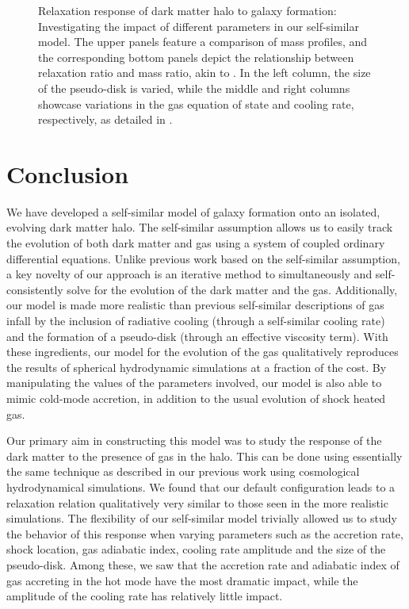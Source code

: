 \begin{figure}[htbp]
\caption{Relaxation response of dark matter halo to galaxy formation: Investigating the impact of different parameters in our self-similar model. The upper panels feature a comparison of mass profiles, and the corresponding bottom panels depict the relationship between relaxation ratio and mass ratio, akin to . In the left column, the size of the pseudo-disk is varied, while the middle and right columns showcase variations in the gas equation of state and cooling rate, respectively, as detailed in .}
\label{fig:relx_reln_all2}
\end{figure}


\section{Conclusion}
\label{sec:conclusion}
We have developed a self-similar model of galaxy formation onto an isolated, evolving dark matter halo. The self-similar assumption allows us to easily track the evolution of both dark matter and gas using a system of coupled ordinary differential equations. Unlike previous work based on the self-similar assumption, a key novelty of our approach is an iterative method to simultaneously and self-consistently solve for the evolution of the dark matter and the gas. Additionally, our model is made more realistic than previous self-similar descriptions of gas infall by the inclusion of radiative cooling (through a self-similar cooling rate) and the formation of a pseudo-disk (through an effective viscosity term). With these ingredients, our model for the evolution of the gas qualitatively reproduces the results of spherical hydrodynamic simulations at a fraction of the cost. By manipulating the values of the parameters involved, our model is also able to mimic cold-mode accretion, in addition to the usual evolution of shock heated gas.

Our primary aim in constructing this model was to study the response of the dark matter to the presence of gas in the halo. This can be done using essentially the same technique as described in our previous work using cosmological hydrodynamical simulations. We found that our default configuration leads to a relaxation relation qualitatively very similar to those seen in the more realistic simulations. The flexibility of our self-similar model trivially allowed us to study the behavior of this response when varying parameters such as the accretion rate, shock location, gas adiabatic index, cooling rate amplitude and the size of the pseudo-disk. Among these, we saw that the accretion rate and adiabatic index of gas accreting in the hot mode have the most dramatic impact, while the amplitude of the cooling rate has relatively little impact.

